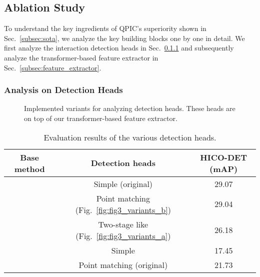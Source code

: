 \documentclass[final]{cvpr}
\begin{document}
\subsection{Ablation Study}\label{subsec:quantitative}
To understand the key ingredients of QPIC's superiority shown in Sec.~\ref{subsec:sota}, we analyze the key building blocks one by one in detail. We first analyze the interaction detection heads in Sec.~\ref{subsec:head} and subsequently analyze the transformer-based feature extractor in Sec.~\ref{subsec:feature_extractor}.

\vspace{-2.0ex}

\subsubsection{Analysis on Detection Heads}\label{subsec:head}
\begin{figure*}[t]
\centering
{}
\caption{Implemented variants for analyzing detection heads. These heads are on top of our transformer-based feature extractor.}\label{fig:variants}
\vspace{-2.0ex}
\end{figure*}

\begin{table}[t]
    \caption{Evaluation results of the various detection heads.}
    \label{table:variants}
    \centering
    \small
    \setlength{\tabcolsep}{4pt}
    \begin{tabular}{@{}ccc@{}}
        \toprule
        Base method & Detection heads & HICO-DET (mAP) \\
        \midrule
         & Simple (original) & 29.07 \\
        & Point matching (Fig.~\ref{fig:fig3_variants_b})  & 29.04 \\
        & Two-stage like (Fig.~\ref{fig:fig3_variants_a}) & 26.18 \\
        \midrule
         & Simple & 17.45 \\
        & Point matching (original) & 21.73 \\
        \bottomrule
    \end{tabular}
    \vspace{-2.0ex}
\end{table}
\end{document}

